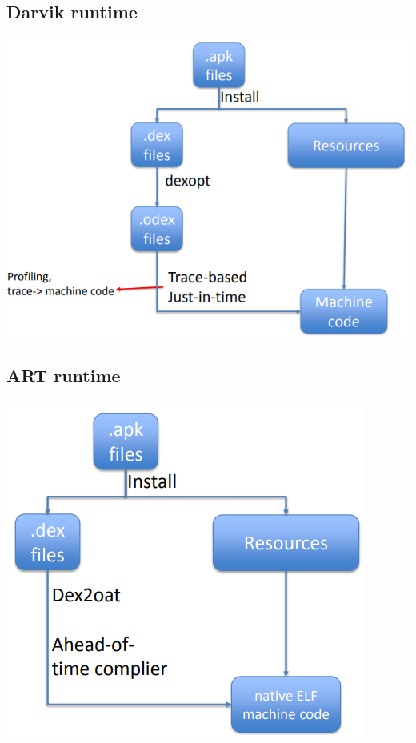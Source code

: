 \documentclass{article}
\begin{document}
\begin{multicols}{2}
  \subsection{Darvik runtime}
  \includegraphics[scale=0.4]{darvik_runtime.png}

  \vfill\null
  
  \subsection{ART runtime}
  \includegraphics[scale=0.4]{art_runtime.png}
\end{multicols}
\end{document}

